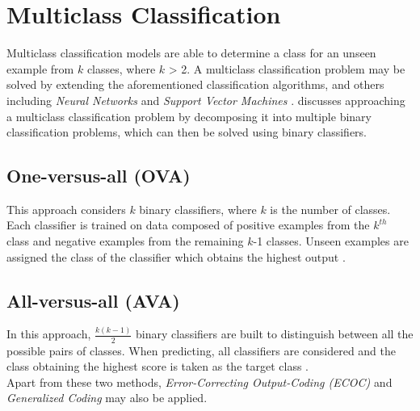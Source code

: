 \section{Multiclass Classification}
\label{sec:multiclass}

Multiclass classification models are able to determine a class for an unseen example from $k$ classes, where $k$ > 2. A multiclass classification problem may be solved by extending the aforementioned classification algorithms, and others including \textit{Neural Networks} and \textit{Support Vector Machines} \citep{aly2005}. \citet{aly2005} discusses approaching a multiclass classification problem by decomposing it into multiple binary classification problems, which can then be solved using binary classifiers.

\subsection{One-versus-all (OVA)} 
This approach considers $k$ binary classifiers, where $k$ is the number of classes. Each classifier is trained on data composed of positive examples from the $k^{th}$ class and negative examples from the remaining $k$-1 classes. Unseen examples are assigned the class of the classifier which obtains the highest output \citep{aly2005}.

\subsection{All-versus-all (AVA)} 

In this approach, $\frac{k(k-1)}{2}$ binary classifiers are built to distinguish between all the possible pairs of classes. When predicting, all classifiers are considered and the class obtaining the highest score is taken as the target class \citep{aly2005}.\\

Apart from these two methods, \textit{Error-Correcting Output-Coding (ECOC)} \citep{dietterich1995} and \textit{Generalized Coding} \citep{allwein2001} may also be applied.

